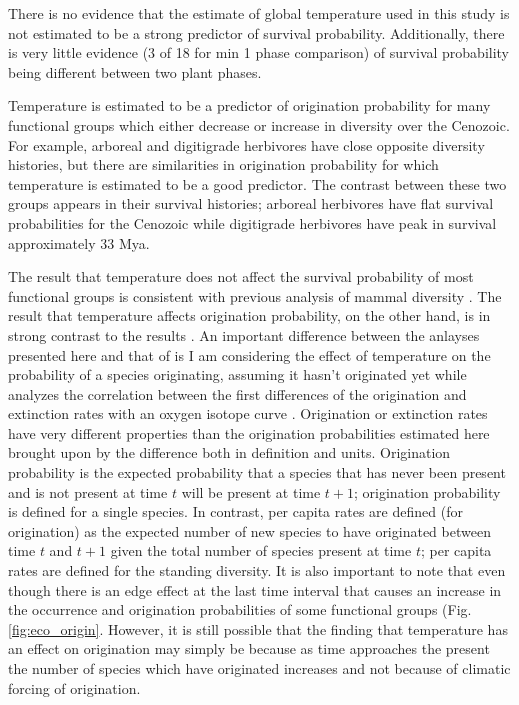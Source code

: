 \documentclass[12pt,letterpaper]{article}
\begin{document}
There is no evidence that the estimate of global temperature used in this study is not estimated to be a strong predictor of survival probability. Additionally, there is very little evidence (3 of 18 for min 1 phase comparison) of survival probability being different between two plant phases. 

Temperature is estimated to be a predictor of origination probability for many functional groups which either decrease or increase in diversity over the Cenozoic. For example, arboreal and digitigrade herbivores have close opposite diversity histories, but there are similarities in origination probability for which temperature is estimated to be a good predictor. The contrast between these two groups appears in their survival histories; arboreal herbivores have flat survival probabilities for the Cenozoic while digitigrade herbivores have peak in survival approximately 33 Mya.

The result that temperature does not affect the survival probability of most functional groups is consistent with previous analysis of mammal diversity \citep{Alroy2000g}. The result that temperature affects origination probability, on the other hand, is in strong contrast to the results \citet{Alroy2000g}. An important difference between the anlayses presented here and that of \citet{Alroy2000g} is I am considering the effect of temperature on the probability of a species originating, assuming it hasn't originated yet while \citet{Alroy2000g} analyzes the correlation between the first differences of the origination and extinction rates with an oxygen isotope curve \citep{Zachos2001}. Origination or extinction rates have very different properties than the origination probabilities estimated here brought upon by the difference both in definition and units. Origination probability is the expected probability that a species that has never been present and is not present at time \(t\) will be present at time \(t + 1\); origination probability is defined for a single species. In contrast, per capita rates are defined (for origination) as the expected number of new species to have originated between time \(t\) and \(t + 1\) given the total number of species present at time \(t\); per capita rates are defined for the standing diversity. It is also important to note that even though there is an edge effect at the last time interval that causes an increase in the occurrence and origination probabilities of some functional groups (Fig. \ref{fig:eco_origin}. However, it is still possible that the finding that temperature has an effect on origination may simply be because as time approaches the present the number of species which have originated increases and not because of climatic forcing of origination. 
\end{document}
